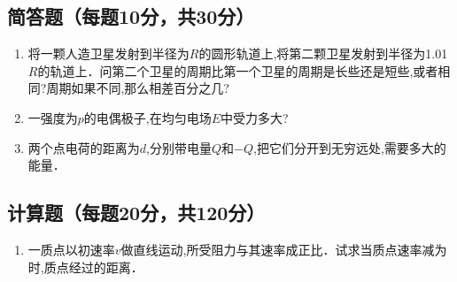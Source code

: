 
\subsection{ 简答题（每题10分，共30分）}
\begin{enumerate}
\item 将一颗人造卫星发射到半径为$R$的圆形轨道上,将第二颗卫星发射到半径为1.01$R$的轨道上．问第二个卫星的周期比第一个卫星的周期是长些还是短些,或者相同?周期如果不同,那么相差百分之几?
\item 一强度为$p$的电偶极子,在均匀电场$E$中受力多大?
\item 两个点电荷的距离为$d$,分别带电量$Q$和$-Q$,把它们分开到无穷远处,需要多大的能量．
\end{enumerate}
\subsection{计算题（每题20分，共120分）}
\begin{enumerate}
\item 一质点以初速率$v$做直线运动,所受阻力与其速率成正比．试求当质点速率减为时,质点经过的距离．
\end{enumerate}